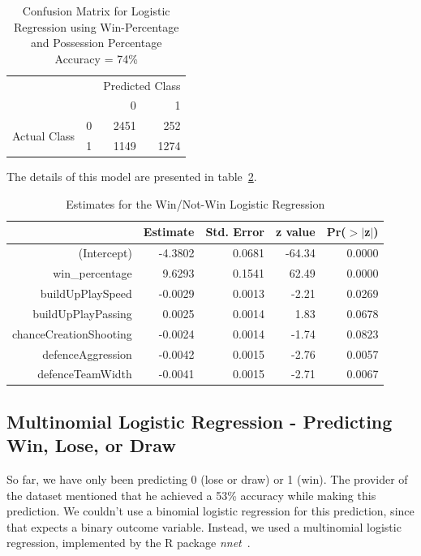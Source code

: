 \documentclass[11pt]{article}
\begin{document}
\begin{table}[ht!]
\centering
\begin{tabular}{|l|l|r|r|}
\hline
\multicolumn{2}{|l|}{\multirow{2}{*}{}} & \multicolumn{2}{l|}{Predicted Class} \\ \cline{3-4}
\multicolumn{2}{|l|}{}                  & 0                 & 1                \\ \hline
\multirow{2}{*}{Actual Class}    & 0    & 2451              & 252              \\ \cline{2-4}
                                 & 1    & 1149              & 1274             \\ \hline
\end{tabular}
\caption{Confusion Matrix for Logistic Regression using Win-Percentage and Possession Percentage\\Accuracy = 74\%}
\label{tab:logistic-fusion2}
\end{table}

The details of this model are presented in table~\ref{tab:logistic-estimate2}.
\begin{table}[h!]
\centering
\begin{tabular}{rrrrr}
  \hline
 & Estimate & Std. Error & z value & Pr($>$$|$z$|$) \\
  \hline
(Intercept) & -4.3802 & 0.0681 & -64.34 & 0.0000 \\
  win\_percentage & 9.6293 & 0.1541 & 62.49 & 0.0000 \\
  buildUpPlaySpeed & -0.0029 & 0.0013 & -2.21 & 0.0269 \\
  buildUpPlayPassing & 0.0025 & 0.0014 & 1.83 & 0.0678 \\
  chanceCreationShooting & -0.0024 & 0.0014 & -1.74 & 0.0823 \\
  defenceAggression & -0.0042 & 0.0015 & -2.76 & 0.0057 \\
  defenceTeamWidth & -0.0041 & 0.0015 & -2.71 & 0.0067 \\
   \hline
\end{tabular}
\caption{Estimates for the Win/Not-Win Logistic Regression}
\label{tab:logistic-estimate2}
\end{table}

\subsection{Multinomial Logistic Regression - Predicting Win, Lose, or Draw}
So far, we have only been predicting 0 (lose or draw) or 1 (win).
The provider of the dataset mentioned that he achieved a 53\% accuracy while making this prediction.
We couldn't use a binomial logistic regression for this prediction, since that expects a binary outcome variable.
Instead, we used a multinomial logistic regression, implemented by the R package \textit{nnet}~\cite{nnet}.
\end{document}

